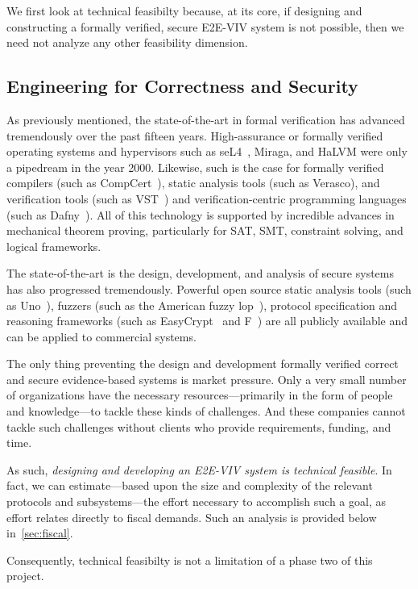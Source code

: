 We first look at technical feasibilty because, at its core, if
designing and constructing a formally verified, secure E2E-VIV system
is not possible, then we need not analyze any other feasibility
dimension.

\subsection{Engineering for Correctness and Security}

As previously mentioned, the state-of-the-art in formal verification
has advanced tremendously over the past fifteen years. High-assurance
or formally verified operating systems and hypervisors such as
seL4~\cite{seL4}, Miraga, and HaLVM were only a pipedream in the year
2000. Likewise, such is the case for formally verified compilers (such
as CompCert~\cite{CompCert}), static analysis tools (such as Verasco),
and verification tools (such as VST~\cite{VST}) and
verification-centric programming languages (such as
Dafny~\cite{Dafny}). All of this technology is supported by incredible
advances in mechanical theorem proving, particularly for SAT, SMT,
constraint solving, and logical frameworks.

The state-of-the-art is the design, development, and analysis of
secure systems has also progressed tremendously. Powerful open source
static analysis tools (such as Uno~\cite{Uno}), fuzzers (such as the
American fuzzy lop~\cite{afl}), protocol specification and reasoning
frameworks (such as EasyCrypt~\cite{EasyCrypt} and F\*~\cite{Fstar})
are all publicly available and can be applied to commercial systems.

The only thing preventing the design and development formally verified
correct and secure evidence-based systems is market pressure. Only a
very small number of organizations have the necessary
resources---primarily in the form of people and knowledge---to tackle
these kinds of challenges. And these companies cannot tackle such
challenges without clients who provide requirements, funding, and
time.

As such, \emph{designing and developing an E2E-VIV system is technical
  feasible}.  In fact, we can estimate---based upon the size and
complexity of the relevant protocols and subsystems---the effort
necessary to accomplish such a goal, as effort relates directly to
fiscal demands. Such an analysis is provided below
in~\autoref{sec:fiscal}. 

Consequently, technical feasibilty is not a limitation of a phase two
of this project.

